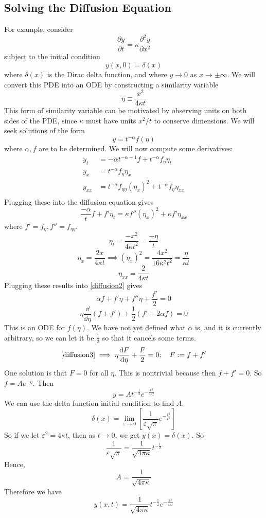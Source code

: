 \documentclass{article}
\begin{document}
\subsection{Solving the Diffusion Equation}
For example, consider
\[ \frac{\partial y}{\partial t} = \kappa \frac{\partial^2 y}{\partial x^2} \]
subject to the initial condition
\[ y(x, 0) = \delta(x) \]
where $\delta(x)$ is the Dirac delta function, and where $y \to 0$ as $x \to \pm \infty$. We will convert this PDE into an ODE by constructing a similarity variable
\[ \eta \equiv \frac{x^2}{4\kappa t} \]
This form of similarity variable can be motivated by observing units on both sides of the PDE, since $\kappa$ must have units $x^2/t$ to conserve dimensions. We will seek solutions of the form
\[ y=t^{-\alpha}f(\eta) \]
where $\alpha, f$ are to be determined. We will now compute some derivatives:
\begin{align*}
	y_t    & = -\alpha t^{-\alpha-1}f + t^{-\alpha} f_\eta \eta_t               \\
	y_x    & = t^{-\alpha}f_\eta \eta_x                                         \\
	y_{xx} & = t^{-\alpha}f_{\eta\eta} (\eta_x)^2 + t^{-\alpha}f_\eta \eta_{xx} \\
\end{align*}
Plugging these into the diffusion equation gives
\begin{equation}\label{diffusion2}
	\frac{-\alpha}{t}f + f'\eta_t = \kappa f''(\eta_{x})^2 + \kappa f' \eta_{xx}
\end{equation}
where $f'=f_\eta, f''=f_{\eta\eta}$.
\[ \eta_t = \frac{-x^2}{4\kappa t^2} = \frac{-\eta}{t} \]
\[ \eta_x = \frac{2x}{4\kappa t} \implies (\eta_x)^2 = \frac{4x^2}{16\kappa^2t^2} = \frac{\eta}{\kappa t} \]
\[ \eta_{xx} = \frac{2}{4\kappa t} \]
Plugging these results into \eqref{diffusion2} gives
\[ \alpha f + f' \eta + f'' \eta + \frac{f'}{2} = 0 \]
\begin{equation}\label{diffusion3}
	\eta \frac{\dd}{\dd \eta}(f + f') + \frac{1}{2}(f' + 2\alpha f) = 0
\end{equation}
This is an ODE for $f(\eta)$. We have not yet defined what $\alpha$ is, and it is currently arbitrary, so we can let it be $\frac{1}{2}$ so that it cancels some terms.
\[ \eqref{diffusion3} \implies \eta \frac{\dd F}{\dd \eta} + \frac{F}{2} = 0;\quad F := f+f' \]
One solution is that $F = 0$ for all $\eta$. This is nontrivial because then $f + f' = 0$. So $f = Ae^{-\eta}$. Then
\[ y = At^{-\frac{1}{2}}e^{-\frac{x^2}{4\kappa t}} \]
We can use the delta function initial condition to find $A$.
\[ \delta(x) = \lim_{\varepsilon \to 0} \left[ \frac{1}{\varepsilon\sqrt \pi} e^{-\frac{x^2}{\varepsilon^2}} \right] \]
So if we let $\varepsilon^2 = 4\kappa t$, then as $t \to 0$, we get $y(x) = \delta(x)$. So
\[ \frac{1}{\varepsilon\sqrt \pi} = \frac{1}{\sqrt{4 \pi \kappa}} t^{-\frac{1}{2}} \]
Hence,
\[ A = \frac{1}{\sqrt{4 \pi \kappa}} \]
Therefore we have
\[ y(x, t) = \frac{1}{\sqrt{4 \pi \kappa}} t^{-\frac{1}{2}} e^{-\frac{x^2}{4\kappa t}} \]
\end{document}
